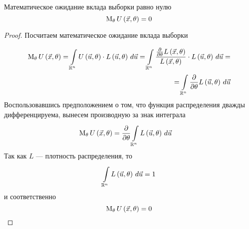\begin{lemma}\label{remark:expectationU}
  Математическое ожидание вклада выборки равно нулю
  \begin{equation*}
    \meanof{\theta}{U\left( \vec{x}, \theta \right)} = 0
  \end{equation*}
\end{lemma}
\begin{proof}
Посчитаем математическое ожидание вклада выборки

\begin{align*}
  \meanof{\theta}{U\left( \vec{x}, \theta \right)}
    = \integral{\mathbb{R}^n}{}{\vec{u}}
      {U\left( \vec{u}, \theta \right)
        \cdot L\left( \vec{u}, \theta \right)}
    = \integral{\mathbb{R}^n}{}{\vec{u}}
      {\frac{\frac{\partial}{\partial\theta}L\left(\vec{x}, \theta\right)}
        {L\left(\vec{x}, \theta\right)}
        \cdot L\left( \vec{u}, \theta \right)} = \\
    = \integral{\mathbb{R}^n}{}{\vec{u}}{\frac{\partial}{\partial\theta}
      L\left( \vec{u}, \theta \right)}
\end{align*}
Воспользовавшись предположением о том,
что функция распределения дважды дифференцируема,
вынесем производную за знак интеграла
\begin{align*}
  \meanof{\theta}{U\left( \vec{x},\theta \right)}
    &=\frac{\partial}{\partial\theta}
      \integral{\mathbb{R}^n}{}{\vec{u}}{L\left( \vec{u},\theta \right)}
\end{align*}
Так как $L$ --- плотность распределения, то
\begin{equation*}
  \integral{\mathbb{R}^n}{}{\vec{u}}{L\left( \vec{u}, \theta \right)} = 1
\end{equation*}
и соответственно
\begin{equation*}
  \meanof{\theta}{U\left( \vec{x}, \theta \right)} = 0
\end{equation*}
\end{proof}

\begin{comment}
\begin{remark}\label{remark:partialLikelihoodNull}
  Частная производная по параметру $\theta$ от функции правдоподобия
  $L\left( \vec{u},\theta \right)$ равна нулю.
\end{remark}
\begin{proof}
  Выше у нас было равенство
  $$\frac{\partial}{\partial\theta}
    \integral{\mathbb{R}^n}{}{\vec{u}}{L\left( \vec{u},\theta \right)}=0$$

  Так как производную можем заносить под знак интеграла
  (согласно замечанию \ref{remark:doubleDiff}), то получаем такое равенство
  $$\integral{\mathbb{R}^n}{}{\vec{u}}{
    \frac{\partial}{\partial\theta}L\left( \vec{u},\theta \right)}=0$$

  Поскольку интеграл не зависит от $\theta$,
  то такое возможно лишь в том случае, когда производная равна нулю
  $$\frac{\partial}{\partial\theta}L\left( \vec{u},\theta \right)=0$$
\end{proof}
\end{comment}

